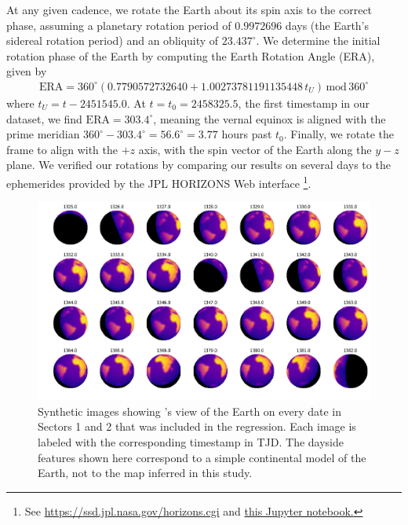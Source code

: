 \documentclass[modern]{aastex62}
\begin{document}
At any given cadence, we rotate the Earth about its spin axis to the correct phase,
assuming a planetary rotation period of $0.9972696$ days (the Earth's sidereal 
rotation period) and an obliquity
of $23.437^\circ$. We determine the initial rotation
phase of the Earth by computing the Earth Rotation Angle (ERA), given by \citep{Urban2013}
%
\begin{align}
\mathrm{ERA} = 360^\circ(0.7790572732640 + 1.00273781191135448 \, t_U) \, \mathrm{mod} \, 360^\circ
\end{align}
%
where $t_U = t - 2451545.0$. At $t = t_0 = 2458325.5$, the first timestamp in our dataset,
we find $\mathrm{ERA} = 303.4^\circ$, meaning the vernal equinox is aligned with
the prime meridian $360^\circ - 303.4^\circ = 56.6^\circ = 3.77$ hours past $t_0$.
%
Finally, we rotate the frame to align
\TESS with the $+z$ axis, with the spin vector of the Earth along the $y-z$ plane.
We verified our rotations by comparing our results on several days to the
ephemerides provided by the JPL HORIZONS Web interface%
\footnote{See \url{https://ssd.jpl.nasa.gov/horizons.cgi} and 
\href{https://github.com/rodluger/earthshine/blob/master/notebooks/SanityCheck.ipynb}{this
Jupyter notebook.}}.

\begin{figure}[t!]
    \begin{centering}
    \includegraphics[width=\linewidth]{figures/phases.pdf}
    \caption{\label{fig:phases}
             Synthetic images showing \TESS's view of the Earth on every date in 
             Sectors 1 and 2 that was included in the regression. Each image 
             is labeled with the corresponding timestamp in TJD. 
             The dayside features shown here correspond to a simple continental
             model of the Earth, not to the map inferred in this study.
             }
    \end{centering}
\end{figure}
\end{document}

